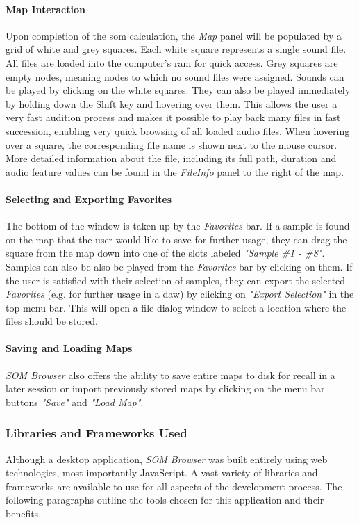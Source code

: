 \paragraph{Map Interaction}
Upon completion of the \gls{som} calculation, the \textit{Map} panel will be
populated by a grid of white and grey squares. Each white square represents a
single sound file. All files are loaded into the computer's \gls{ram} for quick
access. Grey squares are empty nodes, meaning nodes to which no sound
files were assigned. Sounds can be played by clicking on the white squares.
They can also be played immediately by holding down the Shift key and hovering
over them.
This allows the user a very fast audition process and makes it
possible to play back many files in fast succession, enabling very quick
browsing of all loaded audio files. When hovering over a square, the
corresponding file name is shown next to the mouse cursor. More detailed
information about the file, including its full path, duration and audio feature
values can be found in the \textit{FileInfo} panel to the right of the map.

\paragraph{Selecting and Exporting Favorites}
The bottom of the window is taken up by the \textit{Favorites} bar. If a sample
is found on the map that the user would like to save for further usage, they can
drag the square from the map down into one of the slots labeled
\textit{"Sample \#1 - \#8"}. Samples can also be also be played from the
\textit{Favorites} bar by clicking on them. If the user is satisfied with their
selection of samples, they can export the selected \textit{Favorites} (e.g. for
further usage in a \gls{daw}) by clicking on \textit{"Export Selection"} in the
top menu bar. This will open a file dialog window to select a location where the
files should be stored.

\paragraph{Saving and Loading Maps}
\textit{SOM Browser} also offers the ability to save entire maps to disk for
recall in a later session or import previously stored maps by clicking on the
menu bar buttons \textit{"Save"} and \textit{"Load Map"}.

\subsubsection{Libraries and Frameworks Used}
\label{subsubsec:som-browser_libraries}
Although a desktop application, \textit{SOM Browser} was built entirely using
web technologies, most importantly JavaScript. A vast variety of libraries and
frameworks are available to use for all aspects of the development process.
The following paragraphs outline the tools chosen for this application and their
benefits.

